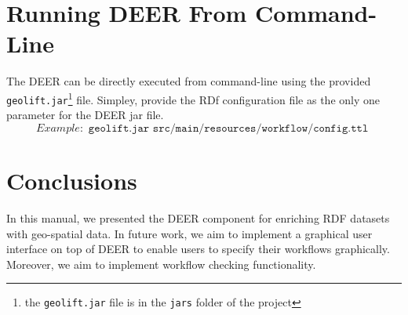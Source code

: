 \documentclass[a4paper,twoside,bibtotoc,abstracton,12pt,BCOR=15mm]{article}
\newcommand{\geolift}{\textsc{DEER}\xspace}
\begin{document}
\section{Running \geolift From Command-Line }

The \geolift can be directly executed from command-line using the provided \texttt{geolift.jar}\footnote{the \texttt{geolift.jar} file is in the \texttt{jars} folder of the project} file.
Simpley, provide the RDf configuration file as the only one parameter for the \geolift jar file.
\begin{equation*}
  Example: \texttt{ geolift.jar src/main/resources/workflow/config.ttl }
\end{equation*}

\section{Conclusions}
In this manual, we presented the \geolift component for enriching RDF datasets with geo-spatial data.
In future work, we aim to implement a graphical user interface on top of \geolift to enable users to specify their workflows graphically.
Moreover, we aim to implement workflow checking functionality.



\end{document}

